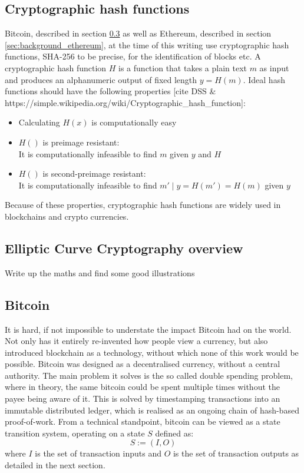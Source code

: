 \documentclass[12pt,msc,a4paper,oneside]{ucl_thesis}
\begin{document}
\subsection{Cryptographic hash functions}
Bitcoin, described in section \ref{sec:background_bitcoin} as well as Ethereum, described in section \ref{sec:background_ethereum}, at the time of this writing use cryptographic hash functions, SHA-256 to be precise, for the identification of blocks etc. A cryptographic hash function $H$ is a function that takes a plain text $m$ as input and produces an alphanumeric output of fixed length $y = H(m)$. Ideal hash functions should have the following properties [cite DSS \& https://simple.wikipedia.org/wiki/Cryptographic\_hash\_function]:
\begin{itemize}
    \item{Calculating $H(x)$ is computationally easy}
    \item{$H()$ is preimage resistant: } \\ It is computationally infeasible to find $m$ given $y$ and $H$
    \item{$H()$ is second-preimage resistant: } \\ It is computationally infeasible to find $m' \mid y=H(m')=H(m)$ given $y$
\end{itemize}
Because of these properties, cryptographic hash functions are widely used in blockchains and crypto currencies.

\subsection{Elliptic Curve Cryptography overview} \label{sec:background_elliptic_curve}
Write up the maths and find some good illustrations



\let\Btctransaction T
\let\btctransaction t
\let\Btcinput I
\let\btcinput i
\let\Btcoutput O
\let\btcoutput o

\subsection{Bitcoin} \label{sec:background_bitcoin}
It is hard, if not impossible to understate the impact Bitcoin had on the world. Not only has it entirely re-invented how people view a currency, but also introduced blockchain as a technology, without which none of this work would be possible. Bitcoin was designed as a decentralised currency, without a central authority. The main problem it solves is the so called double spending problem, where in theory, the same bitcoin could be spent multiple times without the payee being aware of it. This is solved by timestamping transactions into an immutable distributed ledger, which is realised as an ongoing chain of hash-based proof-of-work. From a technical standpoint, bitcoin can be viewed as a state transition system, operating on a state $S$ defined as:
\begin{equation}
    S := (\Btcinput, \Btcoutput)
\end{equation}
where $\Btcinput$ is the set of transaction inputs and $\Btcoutput$ is the set of transaction outputs as detailed in the next section.
\end{document}
